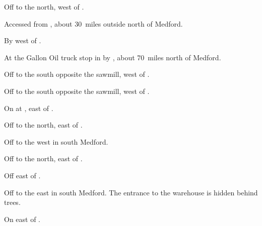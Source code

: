 

\begin{LocationList}

Off  to the north, west of .

Accessed from , about 30~miles outside  north of Medford.

By  west of .

At the Gallon Oil truck stop in  by , about 70~miles north of Medford.

\Location{\GarageHQ \Garage}
Off  to the south opposite the sawmill, west of .

Off  to the south opposite the sawmill, west of .

On  at , east of .

Off  to the north, east of .

Off  to the west in south Medford.

Off  to the north, east of .

\Location{\TruckStop \Gas \Rest \Service}
Off  east of .

Off  to the east in south Medford.
The entrance to the warehouse is hidden behind trees.

On  east of .

\end{LocationList}

